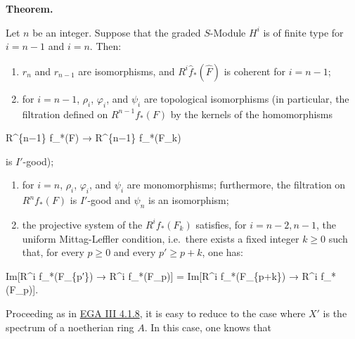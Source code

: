 \documentclass[
  11pt,
  a4paper,
]{book}
\newenvironment{Shaded}{}{}
\newcommand{\NormalTok}[1]{#1}
\begin{document}
\textbf{Theorem.}

Let \(n\) be an integer. Suppose that the graded \(S\)-Module \(H^{i}\)
is of finite type for \(i = n - 1\) and \(i = n\). Then:

\begin{enumerate}
\def\labelenumi{(\arabic{enumi})}
\setcounter{enumi}{-1}
\item
  \(r_{n}\) and \(r_{n-1}\) are isomorphisms, and
  \(R^{i} \hat{f}_{*}(\hat{F})\) is coherent for \(i = n - 1\);
\item
  for \(i = n - 1\), \(\rho_{i}\), \(\varphi_{i}\), and \(\psi_{i}\) are
  topological isomorphisms (in particular, the filtration defined on
  \(R^{n-1} f_{*}(F)\) by the kernels of the homomorphisms
\end{enumerate}

\begin{Shaded}
\begin{Highlighting}[]
\NormalTok{R\^{}\{n−1\} f\_*(F) → R\^{}\{n−1\} f\_*(F\_k)}
\end{Highlighting}
\end{Shaded}

is \(I'\)-good);

\begin{enumerate}
\def\labelenumi{(\arabic{enumi})}
\setcounter{enumi}{1}
\item
  for \(i = n\), \(\rho_{i}\), \(\varphi_{i}\), and \(\psi_{i}\) are
  monomorphisms; furthermore, the filtration on \(R^{n}
  f_{*}(F)\) is \(I'\)-good and \(\psi_{n}\) is an isomorphism;
\item
  the projective system of the \(R^{i} f_{*}(F_{k})\) satisfies, for
  \(i = n - 2, n - 1\), the uniform Mittag-Leffler condition, i.e.~there
  exists a fixed integer \(k \geqslant 0\) such that, for every
  \(p \geqslant 0\) and every \(p'
  \geqslant p + k\), one has:
\end{enumerate}

\begin{Shaded}
\begin{Highlighting}[]
\NormalTok{Im[R\^{}i f\_*(F\_\{p′\}) → R\^{}i f\_*(F\_p)] = Im[R\^{}i f\_*(F\_\{p+k\}) → R\^{}i f\_*(F\_p)].}
\end{Highlighting}
\end{Shaded}

Proceeding as in
\href{https://jcreinhold.github.io/ega/iii/11-ch3-04-fundamental-theorem-proper-morphisms.html\#41-the-fundamental-theorem}{EGA
III 4.1.8}, it is easy to reduce to the case where \(X'\) is the
spectrum of a noetherian ring \(A\). In this case, one knows that
\end{document}

